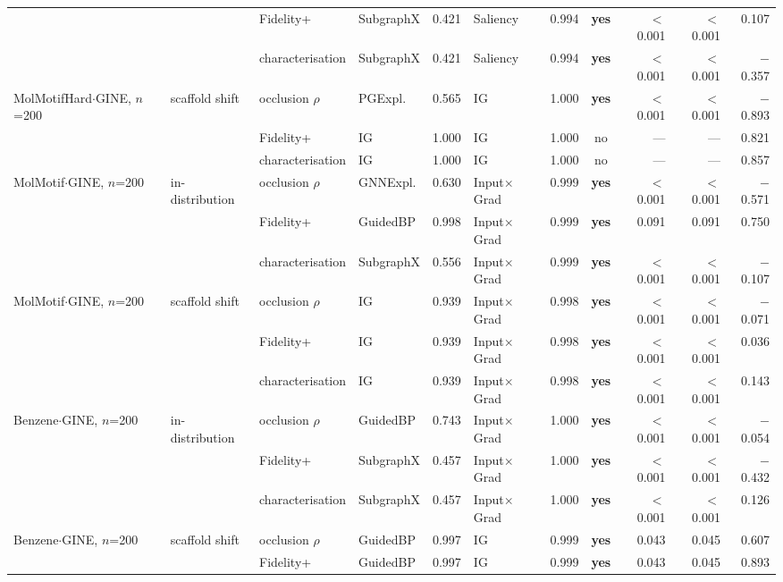 \begin{table}[t]
{\begin{tabular}{llllrlrcrrr}
 &  & Fidelity+ & SubgraphX & 0.421 & Saliency & 0.994 & \textbf{yes} & $<$0.001 & $<$0.001 & 0.107 \\
 &  & characterisation & SubgraphX & 0.421 & Saliency & 0.994 & \textbf{yes} & $<$0.001 & $<$0.001 & $-$0.357 \\
\addlinespace[2pt]
MolMotifHard$\cdot$GINE, $n$=200 & scaffold shift & occlusion $\rho$ & PGExpl. & 0.565 & IG & 1.000 & \textbf{yes} & $<$0.001 & $<$0.001 & $-$0.893 \\
 &  & Fidelity+ & IG & 1.000 & IG & 1.000 & no & --- & --- & 0.821 \\
 &  & characterisation & IG & 1.000 & IG & 1.000 & no & --- & --- & 0.857 \\
\addlinespace[2pt]
MolMotif$\cdot$GINE, $n$=200 & in-distribution & occlusion $\rho$ & GNNExpl. & 0.630 & Input$\times$Grad & 0.999 & \textbf{yes} & $<$0.001 & $<$0.001 & $-$0.571 \\
 &  & Fidelity+ & GuidedBP & 0.998 & Input$\times$Grad & 0.999 & \textbf{yes} & 0.091 & 0.091 & 0.750 \\
 &  & characterisation & SubgraphX & 0.556 & Input$\times$Grad & 0.999 & \textbf{yes} & $<$0.001 & $<$0.001 & $-$0.107 \\
\addlinespace[2pt]
MolMotif$\cdot$GINE, $n$=200 & scaffold shift & occlusion $\rho$ & IG & 0.939 & Input$\times$Grad & 0.998 & \textbf{yes} & $<$0.001 & $<$0.001 & $-$0.071 \\
 &  & Fidelity+ & IG & 0.939 & Input$\times$Grad & 0.998 & \textbf{yes} & $<$0.001 & $<$0.001 & 0.036 \\
 &  & characterisation & IG & 0.939 & Input$\times$Grad & 0.998 & \textbf{yes} & $<$0.001 & $<$0.001 & 0.143 \\
\addlinespace[2pt]
Benzene$\cdot$GINE, $n$=200 & in-distribution & occlusion $\rho$ & GuidedBP & 0.743 & Input$\times$Grad & 1.000 & \textbf{yes} & $<$0.001 & $<$0.001 & $-$0.054 \\
 &  & Fidelity+ & SubgraphX & 0.457 & Input$\times$Grad & 1.000 & \textbf{yes} & $<$0.001 & $<$0.001 & $-$0.432 \\
 &  & characterisation & SubgraphX & 0.457 & Input$\times$Grad & 1.000 & \textbf{yes} & $<$0.001 & $<$0.001 & 0.126 \\
\addlinespace[2pt]
Benzene$\cdot$GINE, $n$=200 & scaffold shift & occlusion $\rho$ & GuidedBP & 0.997 & IG & 0.999 & \textbf{yes} & 0.043 & 0.045 & 0.607 \\
 &  & Fidelity+ & GuidedBP & 0.997 & IG & 0.999 & \textbf{yes} & 0.043 & 0.045 & 0.893 \\

\end{tabular}}
\end{table}
